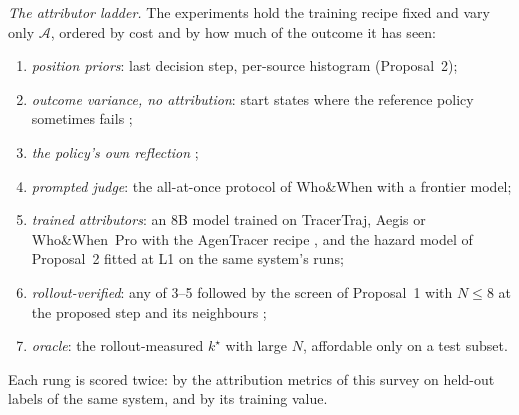\emph{The attributor ladder.} The experiments hold the training recipe fixed and vary only $\mathcal{A}$, ordered by cost and by how much of the outcome it has seen:
\begin{enumerate}[leftmargin=1.4em,itemsep=1pt]
\item \emph{position priors}: last decision step, per-source histogram (Proposal~2);
\item \emph{outcome variance, no attribution}: start states where the reference policy sometimes fails \cite{pivotrl2026};
\item \emph{the policy's own reflection} \cite{guo2026pivoarl};
\item \emph{prompted judge}: the all-at-once protocol of Who\&When with a frontier model;
\item \emph{trained attributors}: an 8B model trained on TracerTraj, Aegis or Who\&When~Pro with the AgenTracer recipe \cite{agentracer2026}, and the hazard model of Proposal~2 fitted at L1 on the same system's runs;
\item \emph{rollout-verified}: any of 3--5 followed by the screen of Proposal~1 with $N\le8$ at the proposed step and its neighbours \cite{liang2026elpo,jung2026prover};
\item \emph{oracle}: the rollout-measured $k^\star$ with large $N$, affordable only on a test subset.
\end{enumerate}
Each rung is scored twice: by the attribution metrics of this survey on held-out labels of the same system, and by its training value.

